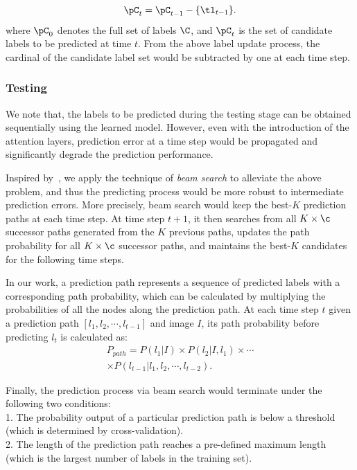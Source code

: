 \documentclass[letterpaper]{article} %
\begin{document}
\begin{equation}
\label{eq:cand_pool}
\pC_t = \pC_{t-1} - \{\tl_{t-1}\}.
\end{equation}
where $\pC_0$ denotes the full set of labels $\C$, and $\pC_t$ is the set of candidate labels to be predicted at time $t$. From the above label update process, the cardinal of the candidate label set would be subtracted by one at each time step.

\subsubsection{Testing}
We note that, the labels to be predicted during the testing stage can be obtained sequentially using the learned model. However, even with the introduction of the attention layers, prediction error at a time step would be propagated and significantly degrade the prediction performance.

Inspired by~\cite{wang2016cnn}, we apply the technique of \emph{beam search} to alleviate the above problem, and thus the predicting process would be more robust to intermediate prediction errors. More precisely, beam search would keep the best-$K$ prediction paths at each time step. At time step $t+1$, it then searches from all $K\times \c$ successor paths generated from the $K$ previous paths, updates the path probability for all $K\times \c$ successor paths, and maintains the best-$K$ candidates for the following time steps.

In our work, a prediction path represents a sequence of predicted labels with a corresponding path probability, which can be calculated by multiplying the probabilities of all the nodes along the prediction path. At each time step $t$ given a prediction path $[l_1, l_2,\cdots, l_{t-1}]$ and image $I$, its path probability before predicting $l_t$ is calculated as:
\begin{equation}
\begin{aligned}
\label{eq:beam_search}
P_{path} = P(l_1|I) \times P(l_2|I, l_1) \times \cdots \\\times P(l_{t-1}|l_1, l_2, \cdots, l_{t-2}).
\end{aligned}
\end{equation}

Finally, the prediction process via beam search would terminate under the following two conditions:\\
1. The probability output of a particular prediction path is below a threshold (which is determined by cross-validation).\\
2. The length of the prediction path reaches a pre-defined maximum length (which is the largest number of labels in the training set).\\
\end{document}

